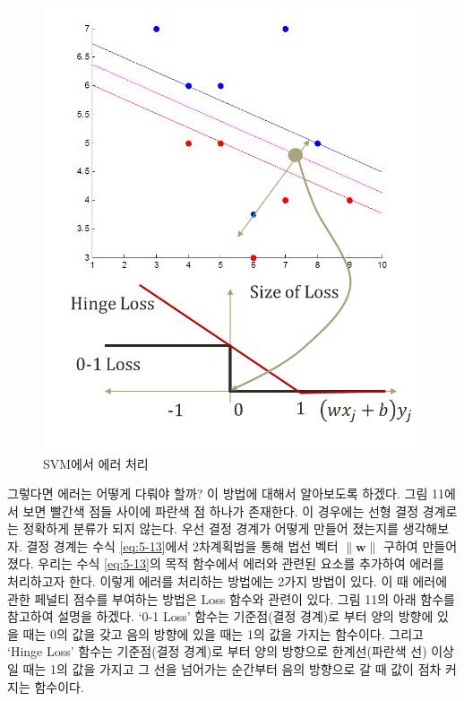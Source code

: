 \documentclass[a4paper]{oblivoir}
\begin{document}
\begin{figure}[ht]\centering
\includegraphics[scale=0.5]{ErrorHandling}\caption{SVM에서 에러 처리}\label{Fig:5-11}
\end{figure}
\indent 그렇다면 에러는 어떻게 다뤄야 할까? 이 방법에 대해서 알아보도록 하겠다. 그림 11에서 보면 빨간색 점들 사이에 파란색 점 하나가 존재한다. 이 경우에는 선형 결정 경계로는 정확하게 분류가 되지 않는다. 우선 결정 경계가 어떻게 만들어 졌는지를 생각해보자. 결정 경계는 수식 \eqref{eq:5-13}에서 2차계획법을 통해 법선 벡터 ${\lVert \mathbf{w}\rVert}$ 구하여 만들어졌다. 우리는 수식 \eqref{eq:5-13}의 목적 함수에서 에러와 관련된 요소를 추가하여 에러를 처리하고자 한다. 이렇게 에러를 처리하는 방법에는 2가지 방법이 있다. 이 때 에러에 관한 페널티 점수를 부여하는 방법은 Loss 함수와 관련이 있다. 그림 11의 아래 함수를 참고하여 설명을 하겠다. `0-1 Loss' 함수는 기준점(결정 경계)로 부터 양의 방향에 있을 때는 0의 값을 갖고 음의 방향에 있을 때는 1의 값을 가지는 함수이다. 그리고 `Hinge Loss' 함수는 기준점(결정 경계)로 부터 양의 방향으로 한계선(파란색 선) 이상일 때는 1의 값을 가지고 그 선을 넘어가는 순간부터 음의 방향으로 갈 때 값이 점차 커지는 함수이다. \\
\end{document}
